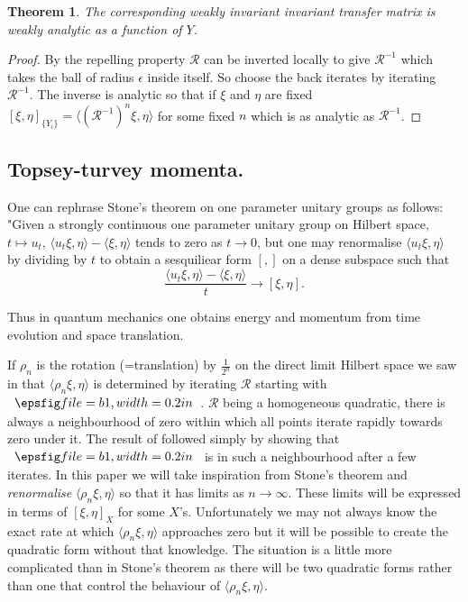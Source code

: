 \documentclass[11pt]{amsart}
\newtheorem{theorem}{Theorem}[section]
\newcommand{\1}{\mathcal I}
\newcommand{\5}{\vskip 5pt}
\begin{document}
\begin{enumerate}
\begin{theorem}
 The corresponding weakly invariant invariant transfer matrix is weakly analytic as a function of $Y$.
 
 \end{theorem}
 \begin{proof}By the repelling property $\mathcal R$ can be inverted locally to give $\mathcal R^{-1}$ which
  takes the ball of radius $\epsilon$
 inside itself. So choose the back iterates by iterating $\mathcal R^{-1}$. The inverse is analytic so that if $\xi$ and $\eta$ are fixed
 $[\xi,\eta]_{\{Y_i\}}=\langle (\mathcal R^{-1})^n\xi,\eta\rangle$ for some fixed $n$ which is as analytic as $\mathcal R^{-1}$.
 \end{proof}
 

 
 \end{enumerate} 
  \subsection{Topsey-turvey momenta.}
  One can rephrase Stone's theorem on one parameter unitary groups as follows:
  "Given a strongly continuous one parameter unitary group on Hilbert space, $t\mapsto u_t$, 
  $\langle u_t \xi, \eta \rangle-\langle \xi,\eta\rangle$ tends to zero as $t\rightarrow 0$, but one may
  renormalise $\langle u_t \xi, \eta \rangle$ by dividing by $t$ to obtain a sesquiliear form $[,]$ on a dense subspace such
  that $$\frac{\langle u_t \xi, \eta \rangle-\langle \xi,\eta\rangle}{t}\rightarrow [\xi,\eta].$$
  
  Thus in quantum mechanics one obtains energy and momentum from time evolution and space translation.
  
       If $\rho_n$ is the rotation (=translation) by $\frac{1}{2^n}$ on the direct limit Hilbert space we 
 saw in \cite{jonogo} that $\langle \rho_n\xi,\eta\rangle$ is determined by iterating $\mathcal R$ starting with $\BA$. $\mathcal R$ being a homogeneous quadratic, there is always a neighbourhood of zero within which all points iterate rapidly
 towards zero under it. The result of \cite{jonogo} followed simply by showing that $\BA$ is in such a neighbourhood
 after a few iterates. In this paper we will take inspiration from Stone's theorem and \emph{renormalise} $\langle \rho_n\xi,\eta\rangle$ so that it has  limits as $n\rightarrow \infty$. These limits
will be expressed in terms of $[\xi,\eta]_X$ for some $X$'s.
  Unfortunately we may not always know the exact rate at which $\langle \rho_n \xi, \eta \rangle$ approaches zero but it will be
  possible to create the quadratic form without that knowledge. The situation is a little more complicated than in Stone's theorem as
  there will be two quadratic forms rather than one that control the behaviour of $\langle \rho_n \xi, \eta \rangle$.
  
\end{document}
